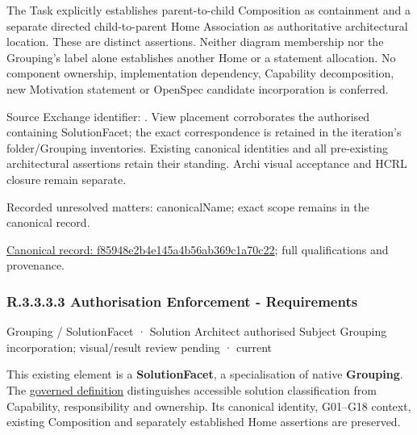 The Task explicitly establishes parent-to-child Composition as containment and
a separate directed child-to-parent Home Association as authoritative architectural
location. These are distinct assertions. Neither diagram membership nor the
Grouping's label alone establishes another Home or a statement allocation.
No component ownership, implementation dependency, Capability decomposition,
new Motivation statement or OpenSpec candidate incorporation is conferred.



Source Exchange identifier: \texttt{}. View placement corroborates
the authorised containing SolutionFacet; the exact correspondence is retained in the
iteration's folder/Grouping inventories. Existing canonical identities and all
pre-existing architectural assertions retain their standing. Archi visual
acceptance and HCRL closure remain separate.


{\small Recorded unresolved matters: canonicalName; exact scope remains in the canonical record.}\par
{\footnotesize \href{../../../../../../../continuum/grouping/f85948e2b4e145a4b56ab369c1a70c22.md}{Canonical record: f85948e2b4e145a4b56ab369c1a70c22}; full qualifications and provenance.}\par
\subsubsection*{R.3.3.3.3 Authorisation Enforcement - Requirements}
\label{navigation:R.3.3.3.3}

\label{element:9a5487f0dd7b42bca1f791aad1257849}
{\small Grouping / SolutionFacet · Solution Architect authorised Subject Grouping incorporation; visual/result review pending · current}\par

This existing element is a \textbf{SolutionFacet}, a specialisation of native
\textbf{Grouping}. The \href{\detokenize{../../../../../../../governance/continuum-representation.md#solutionfacet-classification--1119-candidate}}{governed definition}
distinguishes accessible solution classification from Capability, responsibility
and ownership. Its canonical identity, G01–G18 context, existing Composition
and separately established Home assertions are preserved.



